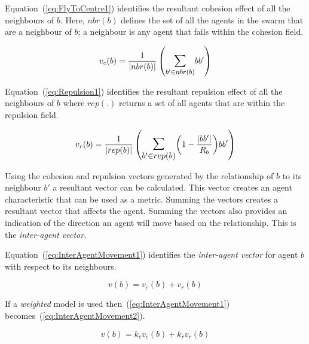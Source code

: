 \documentclass{ieeeaccess}
\begin{document}

Equation~(\ref{eq:FlyToCentre1}) identifies the resultant cohesion effect of all the neighbours of $b$. Here, $nbr(b)$ defines the set of all the agents in the swarm that are a neighbour of $b$; a neighbour is any agent that fails within the cohesion field.

\begin{equation}\label{eq:FlyToCentre1}
v_{c}(b) = \frac{1}{|nbr(b)|}\left({\mathlarger{\sum_{b' \in nbr(b)}}{bb'}}\right)
\end{equation}

Equation~(\ref{eq:Repulsion1}) identifies the resultant repulsion effect of all the neighbours of $b$ where $rep(.)$ returns a set of all agents that are within the repulsion field.

\begin{equation}
\label{eq:Repulsion1}
v_{r}(b) = 
\frac{1}{|rep(b)|}
\left(
\mathlarger{\mathlarger{\sum_{b' \in rep(b)}}}
{\left( 1-\frac{|bb'|}{R_b} \right)}
{bb'}
\right)
\end{equation}

Using the cohesion and repulsion vectors generated by the relationship of $b$ to its neighbour $b'$ a resultant vector can be calculated. This vector creates an agent characteristic that can be used as a metric. Summing the vectors creates a resultant vector that affects the agent. Summing the vectors also provides an indication of the direction an agent will move based on the relationship. This is the \emph{inter-agent vector}.

Equation~(\ref{eq:InterAgentMovement1}) identifies the \emph{inter-agent vector} for agent $b$ with respect to its neighbours.

\begin{equation}\label{eq:InterAgentMovement1}
v(b) = v_{c}(b) + v_{r}(b)
\end{equation}

If a \emph{weighted} model is used then~(\ref{eq:InterAgentMovement1}) becomes~(\ref{eq:InterAgentMovement2}).

\begin{equation}\label{eq:InterAgentMovement2}
v(b) = k_cv_{c}(b) + k_rv_{r}(b)
\end{equation}
\end{document}
